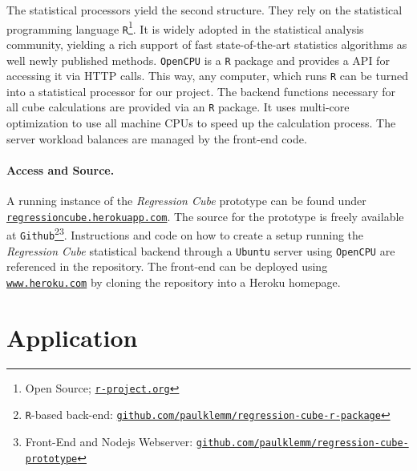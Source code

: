 \documentclass[journal]{style/vgtc} 			          %
\newcommand{\com}[1]{\textcolor{orange}{\uline{#1}}}
\begin{document}
The statistical processors yield the second structure.
They rely on the statistical programming language \texttt{R}\footnote{Open Source; \href{http://r-project.org}{\texttt{r-project.org}}}.
It is widely adopted in the statistical analysis community, yielding a rich support of fast state-of-the-art statistics algorithms as well newly published methods.
\texttt{OpenCPU} is a \texttt{R} package and provides a API for accessing it via HTTP calls.
This way, any computer, which runs \texttt{R} can be turned into a statistical processor for our project.
The backend functions necessary for all cube calculations are provided via an \texttt{R} package.
It uses multi-core optimization to use all machine CPUs to speed up the calculation process.
The server workload balances are managed by the front-end code.

\paragraph{Access and Source.}
A running instance of the \emph{Regression Cube} prototype can be found under \href{http://regressioncube.herokuapp.com/}{\texttt{regressioncube.herokuapp.com}}.
The source for the prototype is freely available at \texttt{Github}\footnote{\texttt{R}-based back-end: \href{https://github.com/paulklemm/regression-cube-r-package}{\texttt{github.com/paulklemm/regression-cube-r-package}}}\footnote{Front-End and Nodejs Webserver: \href{https://github.com/paulklemm/regression-cube-prototype}{\texttt{github.com/paulklemm/regression-cube-prototype}}}.
Instructions and code on how to create a setup running the \emph{Regression Cube} statistical backend through a \texttt{Ubuntu} server using \texttt{OpenCPU} are referenced in the repository.
The front-end can be deployed using \href{https://www.heroku.com/}{\texttt{www.heroku.com}} by cloning the repository into a Heroku homepage. 

\section{Application} \label{application}
%
\end{document}

